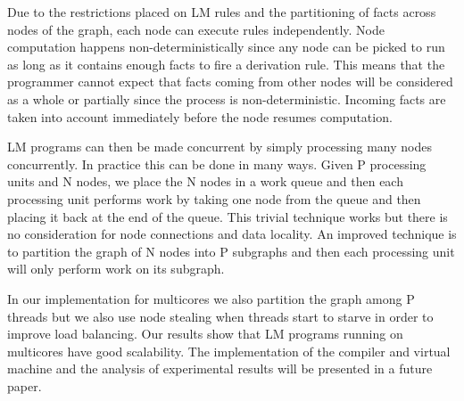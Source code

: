 Due to the restrictions placed on LM rules and the partitioning of facts across nodes of the graph, each node can
execute rules independently. Node computation happens non-deterministically since any node can be picked to run as long as it
contains enough facts to fire a derivation rule. This means that the programmer cannot expect that facts coming from other nodes will
be considered as a whole or partially since the process is non-deterministic. Incoming facts are taken into account immediately before the node
resumes computation.

LM programs can then be made concurrent by simply processing many nodes concurrently. In practice this can be done in many ways.
Given P processing units and N nodes, we place the N nodes in a work queue and then each processing unit performs work by taking
one node from the queue and then placing it back at the end of the queue. This trivial technique works but there is no consideration
for node connections and data locality. An improved technique is to partition the graph of N nodes into P subgraphs and then each
processing unit will only perform work on its subgraph.

In our implementation for multicores we also partition the graph among P threads but we also use node stealing when threads start to starve
in order to improve load balancing.
Our results show that LM programs running on multicores have good scalability. The implementation of the compiler and virtual machine and
the analysis of experimental results will be presented in a future paper.